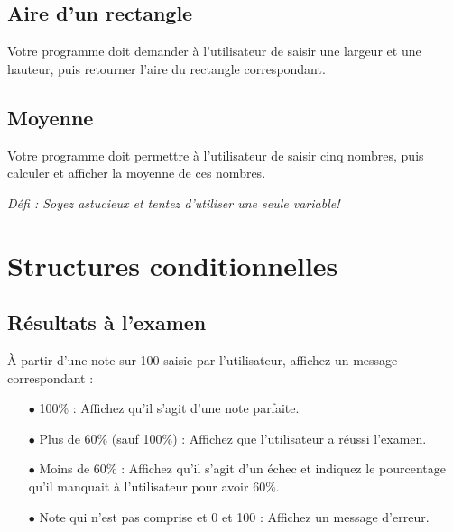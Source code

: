 \documentclass[12pt]{article}
\begin{document}
%
%
%

\subsection{Aire d'un rectangle}

Votre programme doit demander à l'utilisateur de saisir une largeur et une hauteur, puis retourner l'aire du rectangle correspondant.

%
%
%
%

\subsection{Moyenne}

Votre programme doit permettre à l’utilisateur de saisir cinq nombres, puis calculer et afficher la moyenne de ces nombres.

\textit{Défi : Soyez astucieux et tentez d'utiliser une seule variable!}




%
%

\section{Structures conditionnelles}


\subsection{Résultats à l'examen}

À partir d'une note sur 100 saisie par l'utilisateur, affichez un message correspondant :

\begin{itemize}
	\item[$\bullet$] 100\% : Affichez qu'il s'agit d'une note parfaite.
	\item[$\bullet$] Plus de 60\% (sauf 100\%) : Affichez que l'utilisateur a réussi l'examen.
	\item[$\bullet$] Moins de 60\% : Affichez qu'il s'agit d'un échec et indiquez le pourcentage qu'il manquait à l'utilisateur pour avoir 60\%.
	\item[$\bullet$] Note qui n'est pas comprise et 0 et 100 : Affichez un message d'erreur.
\end{itemize}
\end{document}
